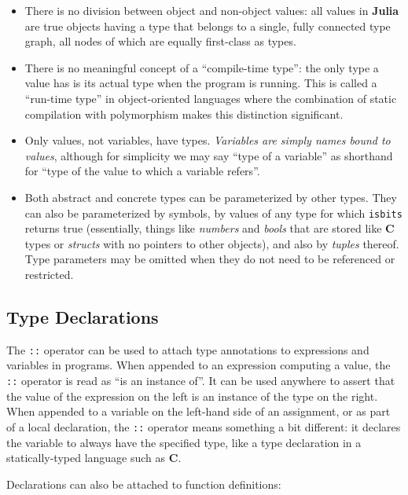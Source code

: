 \documentclass[
]{article}
\providecommand{\tightlist}{%
  \setlength{\itemsep}{0pt}\setlength{\parskip}{0pt}}
\begin{document}
\begin{itemize}
\tightlist
\item
  There is no division between object and non-object values: all values
  in \textbf{Julia} are true objects having a type that belongs to a
  single, fully connected type graph, all nodes of which are equally
  first-class as types.
\item
  There is no meaningful concept of a ``compile-time type'': the only
  type a value has is its actual type when the program is running. This
  is called a ``run-time type'' in object-oriented languages where the
  combination of static compilation with polymorphism makes this
  distinction significant.
\item
  Only values, not variables, have types. \emph{Variables are simply
  names bound to values}, although for simplicity we may say ``type of a
  variable'' as shorthand for ``type of the value to which a variable
  refers''.
\item
  Both abstract and concrete types can be parameterized by other types.
  They can also be parameterized by symbols, by values of any type for
  which \texttt{isbits} returns true (essentially, things like
  \emph{numbers} and \emph{bools} that are stored like \textbf{C} types
  or \emph{structs} with no pointers to other objects), and also by
  \emph{tuples} thereof. Type parameters may be omitted when they do not
  need to be referenced or restricted.
\end{itemize}

\hypertarget{type-declarations}{%
\subsection{Type Declarations}\label{type-declarations}}

The \texttt{::} operator can be used to attach type annotations to
expressions and variables in programs. When appended to an expression
computing a value, the \texttt{::} operator is read as ``is an instance
of''. It can be used anywhere to assert that the value of the expression
on the left is an instance of the type on the right. When appended to a
variable on the left-hand side of an assignment, or as part of a local
declaration, the \texttt{::} operator means something a bit different:
it declares the variable to always have the specified type, like a type
declaration in a statically-typed language such as \textbf{C}.

Declarations can also be attached to function definitions:
\end{document}
